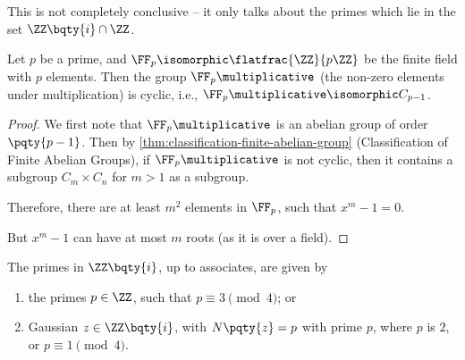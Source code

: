 This is not completely conclusive -- it only talks about the primes which lie in the set \(\ZZ\bqty{i} \cap \ZZ\).

\begin{lemma}
    \label{lem:multiplicative-group-int-mod-p-cyclic}%
    Let \(p\) be a prime, and \(\FF_p \isomorphic \flatfrac{\ZZ}{p \ZZ}\) be the finite field with \(p\) elements. Then the group \(\FF_p\multiplicative\) (the non-zero elements under multiplication) is cyclic, i.e., \(\FF_p\multiplicative \isomorphic C_{p - 1}\).
\end{lemma}

\begin{proof}
    We first note that \(\FF_p\multiplicative\) is an abelian group of order \(\pqty{p - 1}\). Then by \autoref{thm:classification-finite-abelian-group} (Classification of Finite Abelian Groups), if \(\FF_p\multiplicative\) is not cyclic, then it contains a subgroup \(C_m \times C_n\) for \(m > 1\) as a subgroup.

    Therefore, there are at least \(m^2\) elements in \(\FF_p\), such that \(x^m - 1 = 0\).

    But \(x^m - 1\) can have at most \(m\) roots (as it is over a field).
\end{proof}

\begin{theorem}
    \label{thm:prime-gaussian}%
    The primes in \(\ZZ\bqty{i}\), up to associates, are given by
    \begin{enumerate}
        \item the primes \(p \in \ZZ\), such that \(p \equiv 3 \pmod{4}\); or
        \item Gaussian \(z \in \ZZ\bqty{i}\), with \(N\pqty{z} = p\) with prime \(p\), where \(p\) is \(2\), or \(p \equiv 1 \pmod{4}\).
    \end{enumerate}
\end{theorem}

